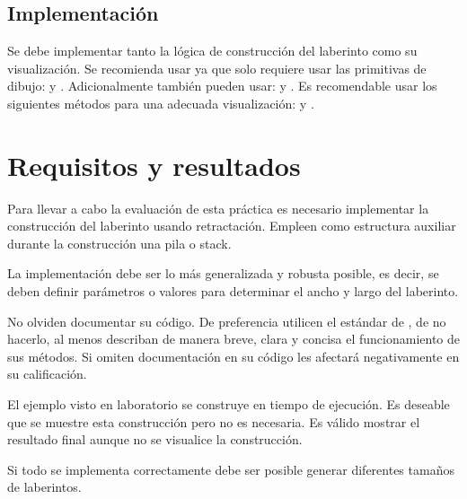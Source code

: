 \subsection{Implementaci\'on}

Se debe implementar tanto la lógica de construcción del laberinto como su visualización. Se recomienda usar  ya que solo requiere usar las primitivas de dibujo:  y . Adicionalmente también pueden usar:  y . Es recomendable usar los siguientes métodos para una adecuada visualización:  y .



\section{Requisitos y resultados}

Para llevar a cabo la evaluación de esta práctica es necesario implementar la construcción del laberinto usando retractación. Empleen como estructura auxiliar durante la construcción una pila o stack.

La implementación debe ser lo más generalizada y robusta posible, es decir, se deben definir parámetros o valores para determinar el ancho y largo del laberinto.

No olviden documentar su código. De preferencia utilicen el estándar de , de no hacerlo, al menos describan de manera breve, clara y concisa el funcionamiento de sus métodos. Si omiten documentación en su código les afectará negativamente en su calificación.

El ejemplo visto en laboratorio se construye en tiempo de ejecución. Es deseable que se muestre esta construcción pero no es necesaria. Es válido mostrar el resultado final aunque no se visualice la construcción.

Si todo se implementa correctamente debe ser posible generar diferentes tamaños de laberintos.




